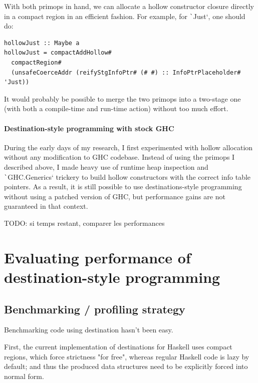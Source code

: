 \documentclass[english]{jflart}
\begin{document}
With both primops in hand, we can allocate a hollow constructor closure directly in a compact region in an efficient fashion. For example, for \texttt`Just`, one should do:
{\small
\begin{verbatim}
hollowJust :: Maybe a
hollowJust = compactAddHollow#
  compactRegion#
  (unsafeCoerceAddr (reifyStgInfoPtr# (# #) :: InfoPtrPlaceholder# 'Just))  
\end{verbatim}
}

It would probably be possible to merge the two primops into a two-stage one (with both a compile-time and run-time action) without too much effort.

\paragraph{Destination-style programming with stock GHC}

During the early days of my research, I first experimented with hollow allocation without any modification to GHC codebase. Instead of using the primops I described above, I made heavy use of runtime heap inspection and \texttt`GHC.Generics` trickery to build hollow constructors with the correct info table pointers. As a result, it is still possible to use destinations-style programming without using a patched version of GHC, but performance gains are not guaranteed in that context.

TODO: si temps restant, comparer les performances

\section{Evaluating performance of destination-style programming}

\subsection{Benchmarking / profiling strategy}

Benchmarking code using destination hasn't been easy.

First, the current implementation of destinations for Haskell uses compact regions, which force strictness "for free", whereas regular Haskell code is lazy by default; and thus the produced data structures need to be explicitly forced into normal form.
\end{document}
